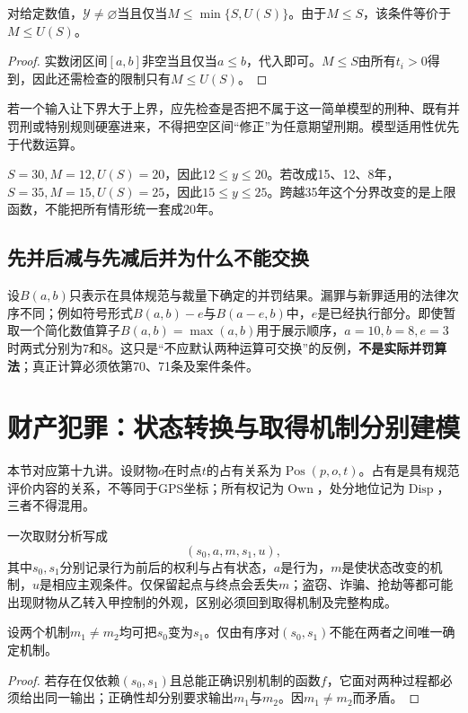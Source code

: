 \begin{modelprop}[区间非空的准确条件]
对给定数值，$\mathcal Y\ne\varnothing$当且仅当$M\le\min\{S,U(S)\}$。由于$M\le S$，该条件等价于$M\le U(S)$。
\end{modelprop}
\begin{proof}
实数闭区间$[a,b]$非空当且仅当$a\le b$，代入即可。$M\le S$由所有$t_i>0$得到，因此还需检查的限制只有$M\le U(S)$。
\end{proof}

若一个输入让下界大于上界，应先检查是否把不属于这一简单模型的刑种、既有并罚刑或特别规则硬塞进来，不得把空区间“修正”为任意期望刑期。模型适用性优先于代数运算。

$S=30,M=12,U(S)=20$，因此$12\le y\le20$。若改成15、12、8年，$S=35,M=15,U(S)=25$，因此$15\le y\le25$。跨越35年这个分界改变的是上限函数，不能把所有情形统一套成20年。

\subsection{先并后减与先减后并为什么不能交换}
设$B(a,b)$只表示在具体规范与裁量下确定的并罚结果。漏罪与新罪适用的法律次序不同；例如符号形式$B(a,b)-e$与$B(a-e,b)$中，$e$是已经执行部分。即使暂取一个简化数值算子$B(a,b)=\max(a,b)$用于展示顺序，$a=10,b=8,e=3$时两式分别为$7$和$8$。这只是“不应默认两种运算可交换”的反例，\textbf{不是实际并罚算法}；真正计算必须依第70、71条及案件条件。


\section{财产犯罪：状态转换与取得机制分别建模}
本节对应第十九讲。设财物$o$在时点$t$的占有关系为$\operatorname{Pos}(p,o,t)$。占有是具有规范评价内容的关系，不等同于GPS坐标；所有权记为$\operatorname{Own}$，处分地位记为$\operatorname{Disp}$，三者不得混用。

一次取财分析写成
\[
 (s_0,a,m,s_1,u),
\]
其中$s_0,s_1$分别记录行为前后的权利与占有状态，$a$是行为，$m$是使状态改变的机制，$u$是相应主观条件。仅保留起点与终点会丢失$m$；盗窃、诈骗、抢劫等都可能出现财物从乙转入甲控制的外观，区别必须回到取得机制及完整构成。

\begin{modelprop}[相同终点不能唯一识别取得机制]
设两个机制$m_1\ne m_2$均可把$s_0$变为$s_1$。仅由有序对$(s_0,s_1)$不能在两者之间唯一确定机制。
\end{modelprop}
\begin{proof}
若存在仅依赖$(s_0,s_1)$且总能正确识别机制的函数$f$，它面对两种过程都必须给出同一输出；正确性却分别要求输出$m_1$与$m_2$。因$m_1\ne m_2$而矛盾。
\end{proof}

